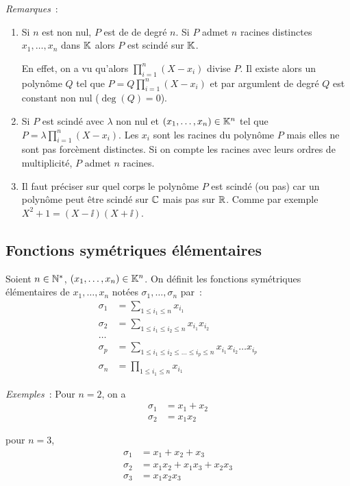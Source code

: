 \emph{Remarques}~:
\begin{enumerate}
\item Si $n$ est non nul, $P$ est de de degré $n$. Si $P$ admet $n$ racines distinctes $x_1, \ldots, x_n$ dans $\mathbb{K}$ alors $P$ est scindé sur $\mathbb{K}$.

  En effet, on a vu qu'alors $\prod_{i=1}^n(X-x_i)$ divise $P$. Il existe alors un polynôme $Q$ tel que $P=Q\prod_{i=1}^n(X-x_i)$ et par argumlent de degré $Q$ est constant non nul ($\deg(Q)=0$).
\item Si $P$ est scindé avec $\lambda$ non nul et $(x_1, \ldots, x_n) \in \mathbb{K}^n$ tel que $P = \lambda \prod_{i=1}^n (X-x_i)$. Les $x_i$ sont les racines du polynôme $P$ mais elles ne sont pas forcèment distinctes. Si on compte les racines avec leurs ordres de multiplicité, $P$ admet $n$ racines.
\item Il faut préciser sur quel corps le polynôme $P$ est scindé (ou pas) car un polynôme peut être scindé sur $\mathbb{C}$ mais pas sur $\mathbb{R}$. Comme par exemple $X^2+1=(X-\ii)(X+\ii)$.
\end{enumerate}

\subsection{Fonctions symétriques élémentaires}

\begin{defdef}
  Soient $n \in \mathbb{N}^*$, $(x_1, \ldots, x_n) \in \mathbb{K}^n$. On définit les fonctions symétriques élémentaires de $x_1, \ldots, x_n$ notées $\sigma_1, \ldots, \sigma_n$ par~:
  \begin{align}
    \sigma_1 &=\sum_{1\leqslant i_1 \leqslant n} x_{i_1} \\
    \sigma_2 &=\sum_{1\leqslant i_1 \leqslant i_2 \leqslant n} x_{i_1} x_{i_2} \\
    \ldots \\
    \sigma_p &=\sum_{1\leqslant i_1 \leqslant i_2 \leqslant \ldots \leqslant i_p\leqslant n} x_{i_1} x_{i_2} \ldots x_{i_p} \\
    \sigma_n &= \prod_{1 \leqslant i_1 \leqslant n} x_{i_1}
  \end{align}
\end{defdef}

\emph{Exemples}~: Pour $n=2$, on a
\begin{align}
  \sigma_1 &=x_1+x_2 \\
  \sigma_2 &=x_1x_2
\end{align}

pour $n=3$, 
\begin{align}
  \sigma_1 &=x_1+x_2+x_3 \\
  \sigma_2 &=x_1x_2+x_1x_3 + x_2x_3 \\
  \sigma_3 &= x_1x_2x_3 
\end{align}

